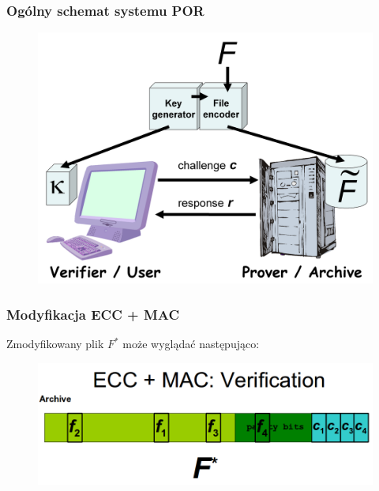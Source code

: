 \documentclass{beamer}
\begin{document}

\begin{frame}
\frametitle{Ogólny schemat systemu POR}

\begin{figure}
\includegraphics[width=0.9\textheight]{por.png}
\end{figure}

\end{frame}


\begin{frame}
\frametitle{Modyfikacja ECC + MAC}

\begin{block}{Zmodyfikowany plik $F^{*}$ może wyglądać następująco:}
\begin{figure}
\includegraphics[width=\textwidth]{modified_file.png}
\end{figure}
\end{block}

\end{frame}
\end{document}
